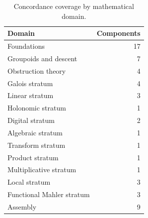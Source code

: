 \begin{table}[t]
\centering
\caption{Concordance coverage by mathematical domain.}
\label{tab:domain-summary}
\small
\begin{tabular}{@{}lr@{}}
\toprule
Domain & Components\\
\midrule
Foundations & 17\\
Groupoids and descent & 7\\
Obstruction theory & 4\\
Galois stratum & 4\\
Linear stratum & 3\\
Holonomic stratum & 1\\
Digital stratum & 2\\
Algebraic stratum & 1\\
Transform stratum & 1\\
Product stratum & 1\\
Multiplicative stratum & 1\\
Local stratum & 3\\
Functional Mahler stratum & 3\\
Assembly & 9\\
\bottomrule
\end{tabular}
\end{table}

